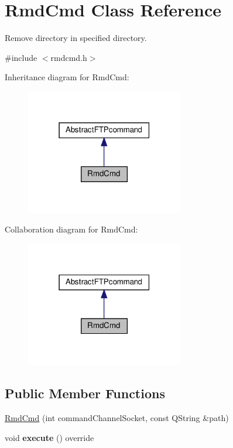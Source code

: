\hypertarget{classRmdCmd}{}\section{Rmd\+Cmd Class Reference}
\label{classRmdCmd}


Remove directory in specified directory.  




{\ttfamily \#include $<$rmdcmd.\+h$>$}



Inheritance diagram for Rmd\+Cmd\+:\nopagebreak
\begin{figure}[H]
\begin{center}
\leavevmode
\includegraphics[width=195pt]{da/da5/classRmdCmd__inherit__graph}
\end{center}
\end{figure}


Collaboration diagram for Rmd\+Cmd\+:\nopagebreak
\begin{figure}[H]
\begin{center}
\leavevmode
\includegraphics[width=195pt]{d3/d12/classRmdCmd__coll__graph}
\end{center}
\end{figure}
\subsection*{Public Member Functions}
\begin{DoxyCompactItemize}
\item 
\hyperlink{classRmdCmd_a1a6b462f1eb60b5db2cd469bf3a673a1}{Rmd\+Cmd} (int command\+Channel\+Socket, const Q\+String \&path)
\item 
\mbox{\label{classRmdCmd_a76ec397d46633f41c1af79e36e2d0c2a}} 
void {\bfseries execute} () override
\end{DoxyCompactItemize}
